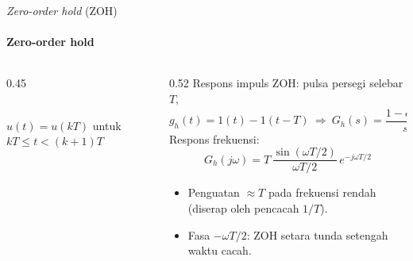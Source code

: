 \documentclass[aspectratio=169,10pt]{beamer}
\begin{document}
\begin{frame}{\textit{Zero-order hold} (ZOH)}
	\framesubtitle{Zero-order hold}
	\begin{columns}[c]
		\begin{column}{0.45\textwidth}
			\centering
			\\
			{\scriptsize $u(t) = u(kT)$ untuk $kT \le t < (k+1)T$}
		\end{column}
		\begin{column}{0.52\textwidth}
			\small
			Respons impuls ZOH: pulsa persegi selebar $T$,
			\[
				g_h(t) = 1(t) - 1(t-T)\ \Rightarrow\ G_h(s) = \frac{1 - e^{-sT}}{s}
			\]
			Respons frekuensi:
			\[
				G_h(j\omega) = T\,\frac{\sin(\omega T/2)}{\omega T/2}\,e^{-j\omega T/2}
			\]
			\begin{itemize}
				\item Penguatan $\approx T$ pada frekuensi rendah (diserap oleh pencacah $1/T$).
				\item Fasa $-\omega T/2$: ZOH \alert{setara tunda setengah waktu cacah}.
			\end{itemize}
		\end{column}
	\end{columns}
\end{frame}
\end{document}
